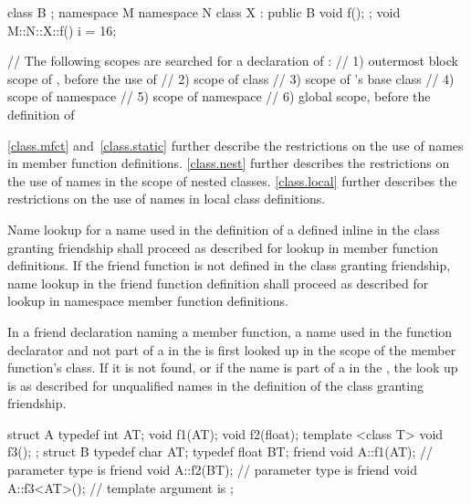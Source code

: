 \begin{example}
\begin{codeblock}
class B { };
namespace M {
  namespace N {
    class X : public B {
      void f();
    };
  }
}
void M::N::X::f() {
  i = 16;
}

// The following scopes are searched for a declaration of :
// 1) outermost block scope of , before the use of 
// 2) scope of class 
// 3) scope of 's base class 
// 4) scope of namespace 
// 5) scope of namespace 
// 6) global scope, before the definition of 
\end{codeblock}
\end{example}
\begin{note}
\ref{class.mfct} and~\ref{class.static} further
describe the restrictions on the use of names in member function
definitions. \ref{class.nest} further describes the restrictions on the
use of names in the scope of nested classes. \ref{class.local} further
describes the restrictions on the use of names in local class
definitions.
\end{note}

\pnum
Name lookup for a name used in the definition of a  defined inline in the class granting
friendship shall proceed as described for lookup in member function
definitions. If the friend function is not defined in the class
granting friendship, name lookup in the friend function
definition shall proceed as described for lookup in namespace member
function definitions.

\pnum
In a friend declaration naming a member function, a name used in
the function declarator and not part of a 
in the  is first looked up in the scope of the
member function's class. If it is not found,
or if the name is part of a
 in
the , the look up is
as described for unqualified names in the definition of the class
granting friendship.
\begin{example}
\begin{codeblock}
struct A {
  typedef int AT;
  void f1(AT);
  void f2(float);
  template <class T> void f3();
};
struct B {
  typedef char AT;
  typedef float BT;
  friend void A::f1(AT);        // parameter type is 
  friend void A::f2(BT);        // parameter type is 
  friend void A::f3<AT>();      // template argument is 
};
\end{codeblock}
\end{example}

